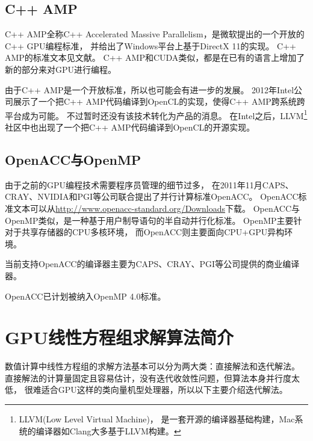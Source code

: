 \subsection{C++ AMP}

C++ AMP全称C++ Accelerated Massive Parallelism，是微软提出的一个开放的C++ GPU编程标准，
并给出了Windows平台上基于DirectX 11的实现。
C++ AMP的标准文本见文献。
C++ AMP和CUDA类似，都是在已有的语言上增加了新的部分来对GPU进行编程。
\cite{cppamp-overview,AdeGTC2013}

由于C++ AMP是一个开放标准，所以也可能会有进一步的发展。
2012年Intel公司展示了一个把C++ AMP代码编译到OpenCL的实现，使得C++ AMP跨系统跨平台成为可能。
\cite{cppamp-opencl}
不过暂时还没有该技术转化为产品的消息。
在Intel之后，LLVM\footnote{LLVM(Low Level Virtual Machine)，
是一套开源的编译器基础构建，Mac系统的编译器如Clang大多基于LLVM构建。}社区中也出现了一个把C++ AMP代码编译到OpenCL的开源实现\cite{llvm-amp-opencl-prototype}。


\subsection{OpenACC与OpenMP}

由于之前的GPU编程技术需要程序员管理的细节过多，
在2011年11月CAPS、CRAY、NVIDIA和PGI等公司联合提出了并行计算标准OpenACC。
\cite{reyes2012comparative}
OpenACC标准文本可以从\url{http://www.openacc-standard.org/Downloads}下载。
OpenACC与OpenMP类似，是一种基于用户制导语句的半自动并行化标准。
OpenMP主要针对于共享存储器的CPU多核环境，
而OpenACC则主要面向CPU+GPU异构环境。

当前支持OpenACC的编译器主要为CAPS、CRAY、PGI等公司提供的商业编译器。

OpenACC已计划被纳入OpenMP 4.0标准。\cite{beyer2011openmp}



\section{GPU线性方程组求解算法简介}

数值计算中线性方程组的求解方法基本可以分为两大类：直接解法和迭代解法。
直接解法的计算量固定且容易估计，没有迭代收敛性问题，但算法本身并行度太低，
很难适合GPU这样的类向量机型处理器，所以以下主要介绍迭代解法。



